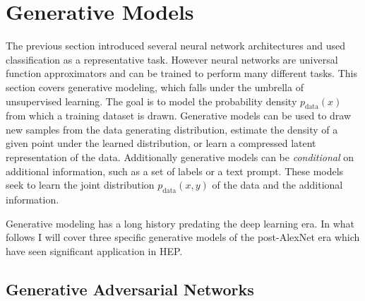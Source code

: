 
\section{Generative Models}
\label{sec:generative}

The previous section introduced several neural network architectures and used classification as a representative task.
However neural networks are universal function approximators and can be trained to perform many different tasks.
This section covers generative modeling, which falls under the umbrella of unsupervised learning.
The goal is to model the probability density $p_\text{data}(x)$ from which a training dataset is drawn.
Generative models can be used to draw new samples from the data generating distribution, estimate the density of a given point under the learned distribution, or learn a compressed latent representation of the data.
Additionally generative models can be \textit{conditional} on additional information, such as a set of labels or a text prompt.
These models seek to learn the joint distribution $p_\text{data}(x, y)$ of the data and the additional information.

Generative modeling has a long history predating the deep learning era.
In what follows I will cover three specific generative models of the post-AlexNet era which have seen significant application in HEP.

\subsection{Generative Adversarial Networks}
\label{sec:gan}

